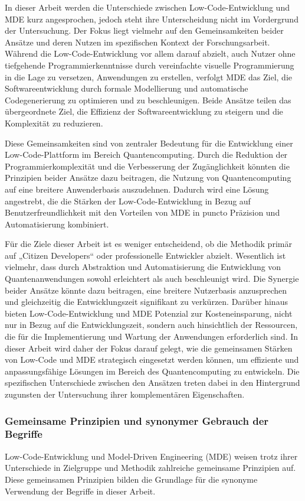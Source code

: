 In dieser Arbeit werden die Unterschiede zwischen Low-Code-Entwicklung und MDE kurz angesprochen, 
jedoch steht ihre Unterscheidung nicht im Vordergrund der Untersuchung. Der Fokus liegt vielmehr auf den Gemeinsamkeiten beider 
Ansätze und deren Nutzen im spezifischen Kontext der Forschungsarbeit. Während die Low-Code-Entwicklung vor allem darauf abzielt, 
auch Nutzer ohne tiefgehende Programmierkenntnisse durch vereinfachte visuelle Programmierung in die Lage zu versetzen, Anwendungen 
zu erstellen, verfolgt MDE das Ziel, die Softwareentwicklung durch formale Modellierung und automatische Codegenerierung zu optimieren 
und zu beschleunigen. Beide Ansätze teilen das übergeordnete Ziel, die Effizienz der Softwareentwicklung zu steigern und 
die Komplexität zu reduzieren.

Diese Gemeinsamkeiten sind von zentraler Bedeutung für die Entwicklung einer Low-Code-Plattform im Bereich Quantencomputing. 
Durch die Reduktion der Programmierkomplexität und die Verbesserung der Zugänglichkeit könnten die Prinzipien beider Ansätze 
dazu beitragen, die Nutzung von Quantencomputing auf eine breitere Anwenderbasis auszudehnen. Dadurch wird eine Lösung angestrebt, 
die die Stärken der Low-Code-Entwicklung in Bezug auf Benutzerfreundlichkeit mit den Vorteilen von MDE in puncto Präzision und 
Automatisierung kombiniert. 

Für die Ziele dieser Arbeit ist es weniger entscheidend, ob die Methodik primär auf „Citizen Developers“ oder professionelle Entwickler abzielt. 
Wesentlich ist vielmehr, dass durch Abstraktion und Automatisierung die Entwicklung von Quantenanwendungen sowohl erleichtert als auch 
beschleunigt wird. Die Synergie beider Ansätze könnte dazu beitragen, eine breitere Nutzerbasis anzusprechen und gleichzeitig die Entwicklungszeit 
signifikant zu verkürzen. Darüber hinaus bieten Low-Code-Entwicklung und MDE Potenzial zur Kosteneinsparung, nicht nur in Bezug auf die 
Entwicklungszeit, sondern auch hinsichtlich der Ressourcen, die für die Implementierung und Wartung der Anwendungen erforderlich sind. 
In dieser Arbeit wird daher der Fokus darauf gelegt, wie die gemeinsamen Stärken von Low-Code und MDE strategisch eingesetzt werden können, 
um effiziente und anpassungsfähige Lösungen im Bereich des Quantencomputing zu entwickeln. Die spezifischen Unterschiede zwischen den 
Ansätzen treten dabei in den Hintergrund zugunsten der Untersuchung ihrer komplementären Eigenschaften.


\subsubsection{Gemeinsame Prinzipien und synonymer Gebrauch der Begriffe}
Low-Code-Entwicklung und Model-Driven Engineering (MDE) weisen trotz ihrer Unterschiede in Zielgruppe und Methodik zahlreiche 
gemeinsame Prinzipien auf. Diese gemeinsamen Prinzipien bilden die Grundlage für die synonyme Verwendung der Begriffe in dieser Arbeit.

